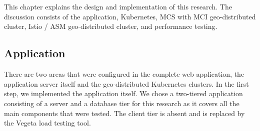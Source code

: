\chapter{\babEmpat}
\label{bab:4}
This chapter explains the design and implementation of this research. The discussion consists of the application, Kubernetes, MCS with MCI geo-distributed cluster, Istio / ASM geo-distributed cluster, and performance testing.




\section{Application}
% 

There are two areas that were configured in the complete web application, the application server itself and the geo-distributed Kubernetes clusters. In the first step, we implemented the application itself. We chose a two-tiered application consisting of a server and a database tier for this research as it covers all the main components that were tested. The client tier is absent and is replaced by the Vegeta load testing tool. 

